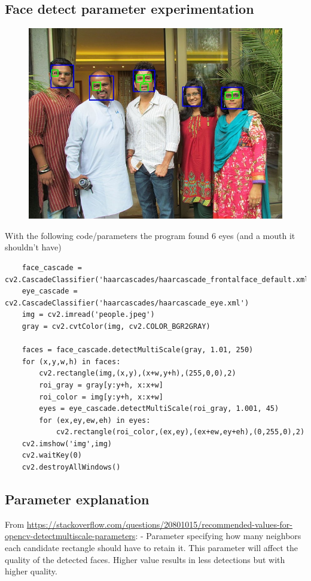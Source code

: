 \documentclass{article}
\begin{document}
 \subsection{Face detect parameter experimentation}
  \begin{figure}[h]
      \centering
      \includegraphics[scale=0.55]{face_detect}
  \end{figure}
 With the following code/parameters the program found 6 eyes (and a mouth it shouldn't have)
 \begin{verbatim}
    face_cascade = cv2.CascadeClassifier('haarcascades/haarcascade_frontalface_default.xml')
    eye_cascade = cv2.CascadeClassifier('haarcascades/haarcascade_eye.xml')
    img = cv2.imread('people.jpeg')
    gray = cv2.cvtColor(img, cv2.COLOR_BGR2GRAY)

    faces = face_cascade.detectMultiScale(gray, 1.01, 250)
    for (x,y,w,h) in faces:
        cv2.rectangle(img,(x,y),(x+w,y+h),(255,0,0),2)
        roi_gray = gray[y:y+h, x:x+w]
        roi_color = img[y:y+h, x:x+w]
        eyes = eye_cascade.detectMultiScale(roi_gray, 1.001, 45)
        for (ex,ey,ew,eh) in eyes:
            cv2.rectangle(roi_color,(ex,ey),(ex+ew,ey+eh),(0,255,0),2)
    cv2.imshow('img',img)
    cv2.waitKey(0)
    cv2.destroyAllWindows()
 \end{verbatim}

 \subsection{Parameter explanation}
    From \url{https://stackoverflow.com/questions/20801015/recommended-values-for-opencv-detectmultiscale-parameters}:  - Parameter specifying how many neighbors each candidate rectangle should have to retain it. This parameter will affect the quality of the detected faces. Higher value results in less detections but with higher quality. 
  
\end{document}
